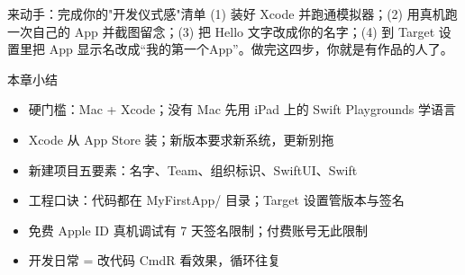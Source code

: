 \begin{tcbpractice}{来动手：完成你的"开发仪式感"清单}
(1) 装好 Xcode 并跑通模拟器；(2) 用真机跑一次自己的 App 并截图留念；(3) 把 Hello 文字改成你的名字；(4) 到 Target 设置里把 App 显示名改成“我的第一个App”。做完这四步，你就是有作品的人了。

\end{tcbpractice}

\begin{tcbsummary}{本章小结}
\begin{itemize}
  \item 硬门槛：Mac + Xcode；没有 Mac 先用 iPad 上的 Swift Playgrounds 学语言
  \item Xcode 从 App Store 装；新版本要求新系统，更新别拖
  \item 新建项目五要素：名字、Team、组织标识、SwiftUI、Swift
  \item 工程口诀：代码都在 MyFirstApp/ 目录；Target 设置管版本与签名
  \item 免费 Apple ID 真机调试有 7 天签名限制；付费账号无此限制
  \item 开发日常 = 改代码 CmdR 看效果，循环往复
\end{itemize}

\end{tcbsummary}
